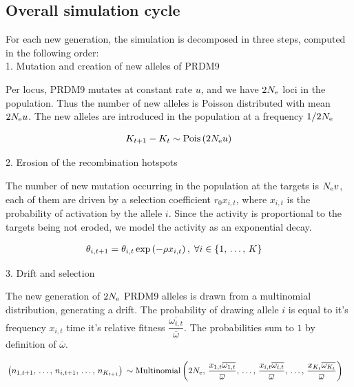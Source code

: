 \documentclass{article}
\begin{document}
\subsection*{Overall simulation cycle} 

For each new generation, the simulation is decomposed in three steps, computed in the following order: \\

1. Mutation and creation of new alleles of PRDM9 

Per locus, PRDM9 mutates at constant rate $u$, and we have $2 N_\mathrm{e}$ loci in the population. Thus the number of new alleles is Poisson distributed with mean $2 N_\mathrm{e} u$. The new alleles are introduced in the population at a frequency $1 / 2 N_\mathrm{e}$

\begin{equation}
  K_{t+1} - K_{t} \sim \operatorname{Pois} \left(2 N_\mathrm{e} u \right)
\end{equation}

2. Erosion of the recombination hotspots 

The number of new mutation occurring in the population at the targets is $ N_\mathrm{e} v$, each of them are driven by a selection coefficient $ r _0  x_{i,t}$, where $x_{i,t}$ is the probability of activation by the allele $i$.
Since the activity is proportional to the targets being not eroded, we model the activity as an exponential decay.

\begin{align}
 \theta _{i,t+1} &=  \theta _{i,t}\operatorname{exp} \left( - \rho x_{i,t} \right), \;
 \forall i \in \{ 1, \, \dots, \, K \}
\end{align}

3. Drift and selection

The new generation of $2 N_\mathrm{e}$ PRDM9 alleles is drawn from a multinomial distribution, generating a drift. The probability of drawing allele $i$ is equal to it's frequency $x_{i,t}$ time it's relative fitness  $\dfrac{\overline{\omega_{i,t}}}{\overline{\omega}}$. The probabilities sum to $1$ by definition of $\overline{\omega}$.

\begin{align}
  & \left(
  n_{1, t+1}, \,
  \dots, \,
  n_{i,t+1}, \,
  \dots, \,
  n_{K_{t+1}}
  \right)  \, \sim \operatorname{Multinomial} \left(2 N_\mathrm{e}, \,
  \dfrac{x_{1,t}  \overline{\omega_{1,t}}}{\overline{\omega}}, \,
  \dots, \,
  \dfrac{x_{i,t}  \overline{\omega_{i,t}}}{\overline{\omega}}, \,
  \dots, \,
  \dfrac{x_{K_{t}} \overline{\omega_{K_{t}}}}{\overline{\omega}}  \right)
\end{align}
\end{document}
